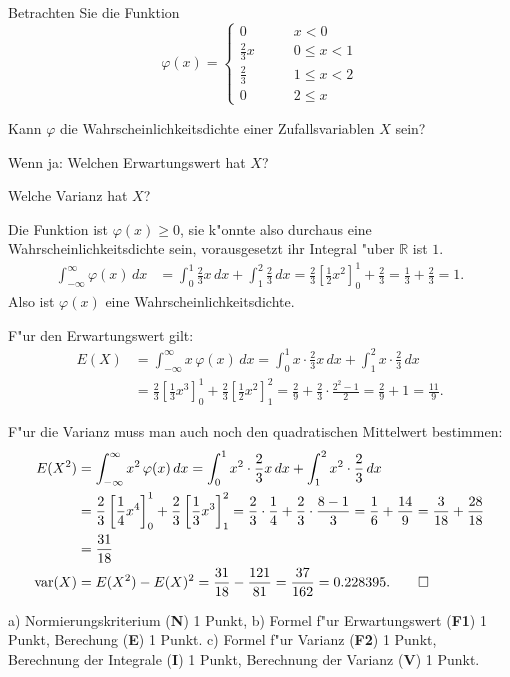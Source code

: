 Betrachten Sie die Funktion
\[
\varphi(x)=\begin{cases}
0&\qquad x < 0\\
\frac23x&\qquad 0\le x< 1\\
\frac23&\qquad 1\le x< 2\\
0&\qquad 2\le x
\end{cases}
\]
\begin{teilaufgaben}
\item Kann $\varphi$ die Wahrscheinlichkeitsdichte einer Zufallsvariablen
$X$ sein?
\item Wenn ja: Welchen Erwartungswert hat $X$?
\item Welche Varianz hat $X$?
\end{teilaufgaben}

\begin{loesung}
\begin{teilaufgaben}
\item Die Funktion ist $\varphi(x)\ge 0$, sie k"onnte also durchaus
eine Wahrscheinlichkeitsdichte sein, vorausgesetzt ihr Integral "uber
$\mathbb R$ ist $1$.
\begin{align*}
\int_{-\infty}^{\infty}\varphi(x)\,dx
&=
\int_0^1\frac23x\,dx
+\int_1^2\frac23\,dx
=\frac23\left[
\frac12x^2
\right]_0^1
+\frac23
=\frac13+\frac23=1.
\end{align*}
Also ist $\varphi(x)$ eine Wahrscheinlichkeitsdichte.
\item F"ur den Erwartungswert gilt:
\begin{align*}
E(X)
&=\int_{-\infty}^{\infty}x\,\varphi(x)\,dx
=
\int_0^1 x\cdot \frac23x\,dx + \int_1^2x\cdot \frac23\,dx
\\
&=
\frac23\left[ \frac13x^3 \right]_0^1 + \frac23\left[ \frac12x^2 \right]_1^2
=\frac29 + \frac23\cdot\frac{2^2-1}2
=\frac29 + 1=\frac{11}9.
\end{align*}
\item F"ur die Varianz muss man auch noch den quadratischen Mittelwert
bestimmen:
\begin{align*}
E(X^2)
&=
\int_{-\infty}^{\infty}x^2\,\varphi(x)\,dx
=
\int_0^1 x^2\cdot \frac23x\,dx + \int_1^2x^2\cdot \frac23\,dx
\\
&=
\frac23 \left[ \frac14 x^4 \right]_0^1
+\frac23 \left[ \frac13 x^3 \right]_1^2
=\frac23\cdot\frac14+\frac23\cdot\frac{8-1}3
=\frac16+\frac{14}9=\frac3{18}+\frac{28}{18}
\\
&=\frac{31}{18}
\\
\operatorname{var}(X)
&=
E(X^2)-E(X)^2
=\frac{31}{18}-\frac{121}{81}
=\frac{37}{162}
=0.228395.
\qedhere
\end{align*}
\end{teilaufgaben}
\end{loesung}

\begin{bewertung}
a) Normierungskriterium ({\bf N}) 1 Punkt,
b) Formel f"ur Erwartungswert ({\bf F1}) 1 Punkt, Berechung ({\bf E}) 1 Punkt.
c) Formel f"ur Varianz ({\bf F2}) 1 Punkt, Berechnung der Integrale ({\bf I})
1 Punkt, Berechnung der Varianz ({\bf V}) 1 Punkt.
\end{bewertung}
